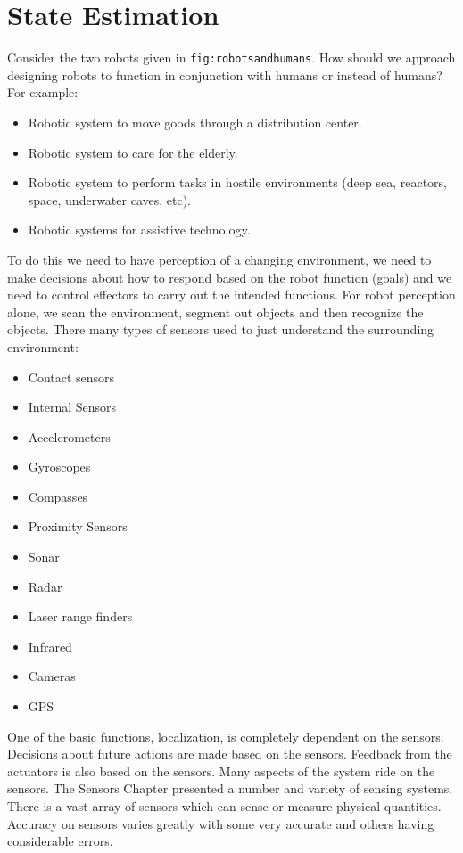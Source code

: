 \hypertarget{Chap:Filtering}{%
\section{State Estimation}\label{Chap:Filtering}}

Consider the two robots given in \texttt{fig:robotsandhumans}. How
should we approach designing robots to function in conjunction with
humans or instead of humans? For example:

\begin{itemize}
\tightlist
\item
  Robotic system to move goods through a distribution center.
\item
  Robotic system to care for the elderly.
\item
  Robotic system to perform tasks in hostile environments (deep sea,
  reactors, space, underwater caves, etc).
\item
  Robotic systems for assistive technology.
\end{itemize}

To do this we need to have perception of a changing environment, we need
to make decisions about how to respond based on the robot function
(goals) and we need to control effectors to carry out the intended
functions. For robot perception alone, we scan the environment, segment
out objects and then recognize the objects. There many types of sensors
used to just understand the surrounding environment:

\begin{itemize}
\tightlist
\item
  Contact sensors
\item
  Internal Sensors
\item
  Accelerometers
\item
  Gyroscopes
\item
  Compasses
\item
  Proximity Sensors
\item
  Sonar
\item
  Radar
\item
  Laser range finders
\item
  Infrared
\item
  Cameras
\item
  GPS
\end{itemize}

One of the basic functions, localization, is completely dependent on the
sensors. Decisions about future actions are made based on the sensors.
Feedback from the actuators is also based on the sensors. Many aspects
of the system ride on the sensors. The Sensors Chapter presented a
number and variety of sensing systems. There is a vast array of sensors
which can sense or measure physical quantities. Accuracy on sensors
varies greatly with some very accurate and others having considerable
errors.

